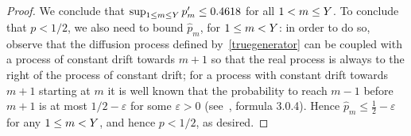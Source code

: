 \begin{proof}
 We conclude that $\sup_{1\le m \le Y} p'_m\leq 0.4618$ for all $1<m\le Y$. To conclude that $p < 1/2$, we also need to bound $\widehat{p}_m$, for $1 \le m < Y$: in order to do so, observe that the diffusion process defined by~\eqref{truegenerator} can be coupled with a process of constant drift towards $m+1$ so that the real process is always to the right of the process of constant drift; for a process with constant drift towards $m+1$ starting at $m$ it is well known that the probability to reach $m-1$ before $m+1$ is at most $1/2-\varepsilon$ for some $\varepsilon > 0$ (see~\cite{Borodin2002}, formula 3.0.4).
 Hence $\widehat{p}_m \le \frac12 - \varepsilon$ for any $1 \le m < Y$, and hence $p < 1/2$, as desired.



\end{proof}
